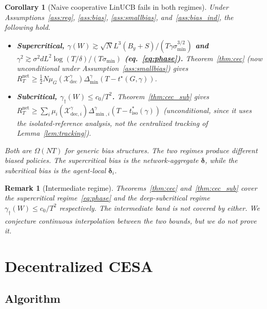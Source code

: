\documentclass[11pt]{article}
\newtheorem{corollary}[theorem]{Corollary}
\newtheorem*{remark}{Remark}
\begin{document}
\begin{corollary}[Naive cooperative LinUCB fails in both regimes]
\label{cor:both}
Under Assumptions~\ref{ass:reg}, \ref{ass:bias}, \ref{ass:smallbias},
and~\ref{ass:bias_ind}, the following hold.
\begin{itemize}
\item \textbf{Supercritical,
$\gamma(W)\gtrsim\sqrt N L^3(B_y+S)/(T\gamma\sigma_{\min}^{3/2})$
and $\gamma^2\gtrsim\sigma^2 dL^2\log(T/\delta)/(T\sigma_{\min})$
(eq.~\eqref{eq:phase}).}
Theorem~\ref{thm:cec} (now unconditional under
Assumption~\ref{ass:smallbias}) gives
$R_T^{\mathrm{net}}\geq \tfrac12 N\mu_G(\mathcal{X}_{\mathrm{dec}}^\gamma)
\Delta_{\min}^\gamma(T-t^\star(G,\gamma))$.
\item \textbf{Subcritical, $\gamma_\dagger(W)\leq c_0/T^2$.}
Theorem~\ref{thm:cec_sub} gives
$R_T^{\mathrm{net}}\geq\sum_i\mu_i(\mathcal{X}_{\mathrm{dec},i}^\gamma)
\Delta_{\min,i}^\gamma(T-t_{\mathrm{iso}}^*(\gamma))$
(unconditional, since it uses the isolated-reference analysis, not
the centralized tracking of Lemma~\ref{lem:tracking}).
\end{itemize}
Both are $\Omega(NT)$ for generic bias structures.  The two regimes
produce different biased policies. The supercritical bias is the
network-aggregate $\bm{\delta}$, while the subcritical bias is the
agent-local $\bm{\delta}_i$.
\end{corollary}

\begin{remark}[Intermediate regime]
Theorems~\ref{thm:cec} and~\ref{thm:cec_sub} cover the supercritical
regime~\eqref{eq:phase} and the deep-subcritical regime
$\gamma_\dagger(W)\leq c_0/T^2$ respectively.  The intermediate band is
not covered by either. We conjecture continuous interpolation between
the two bounds, but we do not prove it.
\end{remark}


\section{Decentralized CESA}\label{sec:dcesa}

\subsection{Algorithm}\label{sec:dcesa_algo}
\end{document}
